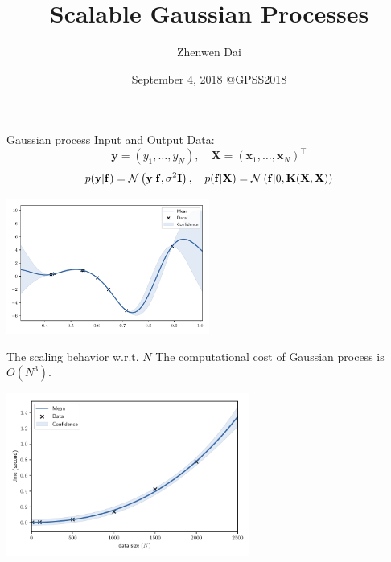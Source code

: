 \documentclass[14pt,aspectratio=1610]{beamer}
\newcommand{\yV}{\mathbf{y}}
\newcommand{\fV}{\mathbf{f}}
\newcommand{\xM}{\mathbf{X}}
\newcommand{\xV}{\mathbf{x}}
\newcommand{\K}{\mathbf{K}}
\newcommand{\I}{\mathbf{I}}
\begin{document}
\title{Scalable Gaussian Processes}
\author{Zhenwen Dai}
\date{September 4, 2018 @GPSS2018}
\frame{\maketitle}


\begin{frame}{Gaussian process}
Input and Output Data: 
\[
\yV = (y_1, \ldots, y_N), \quad \xM = (\xV_1, \ldots, \xV_N)^\top
\]
\begin{align*}
p(\yV| \fV) = \gaussianDist{\yV}{\fV}{\sigma^2 \I}, \quad p (\fV| \xM) = \gaussianDist{\fV}{0}{\K(\xM, \xM)}
\end{align*}
\begin{center}
\includegraphics[width=0.5\textwidth]{gp_first_example.pdf} 
\end{center}
\end{frame}

\begin{frame}{The scaling behavior w.r.t. $N$}
The computational cost of Gaussian process is $O(N^3)$.
\begin{center}
\includegraphics[width=0.6\textwidth]{gp_scaling.pdf} 
\end{center}
\end{frame}
\end{document}
